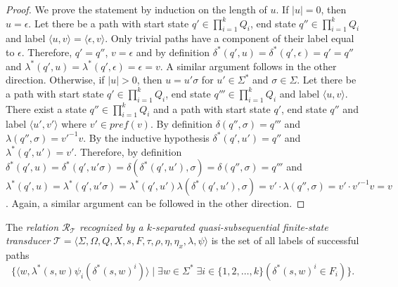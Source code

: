 \begin{proof}
  We prove the statement by induction on the length of $u$. If $|u| = 0$, then $u =
  \epsilon$. Let there be a path with start state $q' \in \prod_{i=1}^k Q_i$, end state
  $q'' \in \prod_{i=1}^k Q_i$ and label $\langle u, v \rangle = \langle \epsilon, v
  \rangle$. Only trivial paths have a component of their label equal to $\epsilon$.
  Therefore, $q' = q''$, $v = \epsilon$ and by definition $\delta^*(q', u) =
  \delta^*(q', \epsilon) = q' = q''$ and $\lambda^*(q', u) = \lambda^*(q', \epsilon)
  = \epsilon = v$. A similar argument follows in the other direction. Otherwise, if
  $|u| > 0$, then $u = u'\sigma$ for $u' \in \Sigma^*$ and $\sigma \in \Sigma$. Let
  there be a path with start state $q' \in \prod_{i=1}^k Q_i$, end state $q''' \in
  \prod_{i=1}^k Q_i$ and label $\langle u, v \rangle$. There exist a state $q'' \in
  \prod_{i=1}^k Q_i$ and a path with start state $q'$, end state $q''$ and label
  $\langle u', v' \rangle$ where $v' \in pref(v)$. By definition $\delta(q'', \sigma)
  = q'''$ and $\lambda(q'', \sigma) = v'^{-1}v$. By the inductive hypothesis
  $\delta^*(q', u') = q''$ and $\lambda^*(q', u') = v'$. Therefore, by definition
  $\delta^*(q', u) = \delta^*(q', u'\sigma) = \delta(\delta^*(q', u'), \sigma) =
  \delta(q'', \sigma) = q'''$ and $\lambda^*(q', u) = \lambda^*(q', u'\sigma) =
  \lambda^*(q', u')\lambda(\delta^*(q', u'), \sigma) = v' \cdot \lambda(q'', \sigma)
  = v' \cdot v'^{-1}v = v$. Again, a similar argument can be followed in the other
  direction.
\end{proof}

\begin{definition}
  The \emph{relation $\mathcal{R}_\mathcal{T}$ recognized by a $k$-separated
  quasi-subsequential finite-state transducer} $\mathcal{T} = \langle \Sigma,
  \Omega, Q, X, s, F, \tau, \rho, \eta, \eta_x, \lambda, \psi \rangle$ is the set of
  all labels of successful paths
  \begin{equation*}
    \{ \langle w, \lambda^*(s, w) \psi_i(\delta^*(s, w)^i) \rangle \mid \exists w
    \in \Sigma^* \; \exists i \in \{ 1, 2, \ldots, k \}(\delta^*(s, w)^i \in F_i) \}.
  \end{equation*}
\end{definition}
